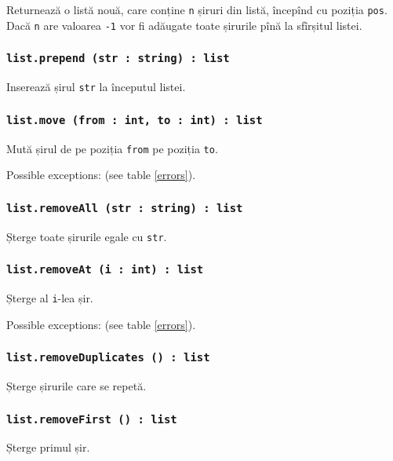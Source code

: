 Returnează o listă nouă, care conține \texttt{n} șiruri din listă, începînd cu poziția \texttt{pos}. Dacă \texttt{n} are valoarea \texttt{-1} vor fi adăugate toate șirurile pînă la sfîrșitul listei.

\subsubsection{\texttt{list.prepend (str : string) : list}}

Inserează șirul \texttt{str} la începutul listei.

\subsubsection{\texttt{list.move (from : int, to : int) : list}}

Mută șirul de pe poziția \texttt{from} pe poziția \texttt{to}.

Possible exceptions:  (see table \ref{errors}).

\subsubsection{\texttt{list.removeAll (str : string) : list}}

Șterge toate șirurile egale cu \texttt{str}.

\subsubsection{\texttt{list.removeAt (i : int) : list}}

Șterge al \texttt{i}-lea șir.

Possible exceptions:  (see table \ref{errors}).

\subsubsection{\texttt{list.removeDuplicates () : list}}

Șterge șirurile care se repetă.

\subsubsection{\texttt{list.removeFirst () : list}}

Șterge primul șir.

